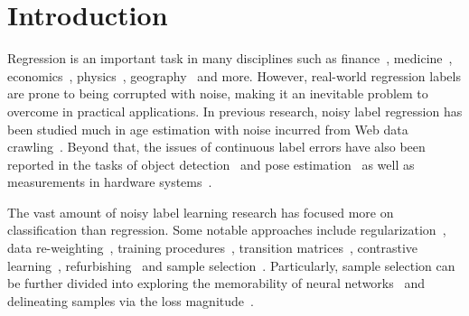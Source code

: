 \documentclass{article}
\theoremstyle{plain}
\theoremstyle{definition}
\theoremstyle{remark}
\begin{document}
\section{Introduction}\label{sec:introduction}
Regression %
is an important task in many disciplines such as finance~\citep{zhang17finance,wu20finance}, medicine~\citep{coen21medicine,tanaka22medicine}, 
economics~\citep{zhang22economics}, physics~\citep{sial2020light, doi22physics}, geography~\citep{liu23elnino} and more.
However, real-world regression labels are prone to being corrupted with noise, making it an inevitable problem to overcome in practical applications. %
In previous research, noisy label regression has been studied much in age estimation with noise incurred from Web data crawling~\citep{rothe18imdb, lin2021imdbclean}.
Beyond that, the issues of continuous label errors have also been reported in the tasks of object detection~\citep{su2012crowdsourcingAF,ma2022TheEO} and pose estimation~\citep{geng2014headPE} as well as measurements in hardware systems~\citep{zhou2012onTS,zang2019TheIO}.

The vast amount of noisy label learning research has focused more on classification than regression. %
Some notable approaches include regularization~\citep{wang19sce, zhang18nips},
data re-weighting~\citep{ren18l2r,shen19icml}, training procedures~\citep{jiang17icml},
transition matrices~\citep{yao2020dual, xia2020part}, contrastive learning~\citep{zhang2021codim, li2022selective},
refurbishing~\citep{song19b} and sample selection~\citep{lee18cleannet, ostyakov18eccv}.
Particularly, sample selection can be further divided into
exploring the memorability of neural networks~\citep{arpit17memory,zhang17memory}
and delineating samples via the loss magnitude~\citep{wei20jocor}.
\end{document}
